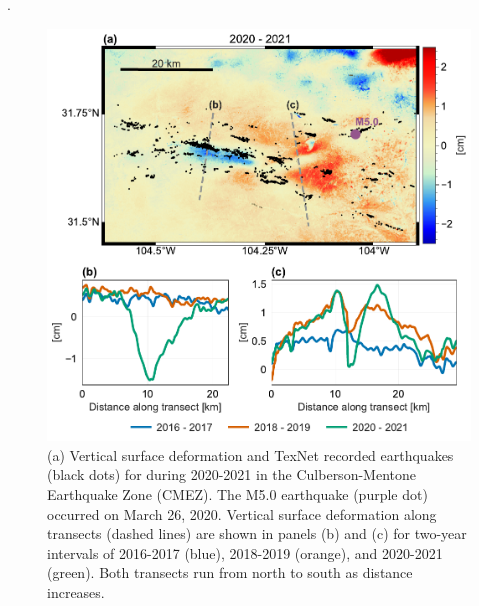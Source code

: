 
.



\begin{figure}
	\centering
	\includegraphics[width=.98\textwidth]{figures/chapter5-lowess/figure-cmez-zoom-transect.pdf}
	\caption[Culberson-Mentone Earthquake Zone earthquakes during 2020 - 2021]{
		(a) Vertical surface deformation and TexNet recorded earthquakes (black dots) for during 2020-2021 in the Culberson-Mentone Earthquake Zone (CMEZ).
		The M5.0 earthquake (purple dot) occurred on March 26, 2020.
		Vertical surface deformation along transects (dashed lines) are shown in panels (b) and (c) for two-year intervals of 2016-2017 (blue), 2018-2019 (orange), and 2020-2021 (green). Both transects run from north to south as distance increases.
	}
	\label{fig:ch5-discuss-cmez-transects}
\end{figure}













